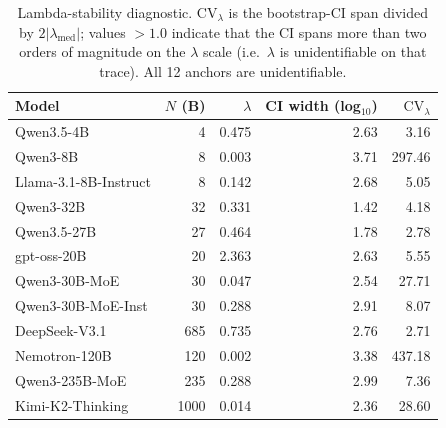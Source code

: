 \begin{table}[t]
\centering
\small
\caption{Lambda-stability diagnostic.  $\mathrm{CV}_\lambda$ is the
bootstrap-CI span divided by $2 |\lambda_\mathrm{med}|$; values
$> 1.0$ indicate that the CI spans more than two orders of magnitude
on the $\lambda$ scale (i.e.\ $\lambda$ is unidentifiable on that
trace).  All 12 anchors are unidentifiable.
\label{tab:iter109-stability}}
\begin{tabular}{lrrrr}
\toprule
Model & $N$ (B) & $\lambda$ & CI width (log$_{10}$) & $\mathrm{CV}_\lambda$ \\
\midrule
Qwen3.5-4B            &    4 &  0.475 &  2.63 &    3.16 \\
Qwen3-8B              &    8 &  0.003 &  3.71 &  297.46 \\
Llama-3.1-8B-Instruct &    8 &  0.142 &  2.68 &    5.05 \\
Qwen3-32B             &   32 &  0.331 &  1.42 &    4.18 \\
Qwen3.5-27B           &   27 &  0.464 &  1.78 &    2.78 \\
gpt-oss-20B           &   20 &  2.363 &  2.63 &    5.55 \\
Qwen3-30B-MoE         &   30 &  0.047 &  2.54 &   27.71 \\
Qwen3-30B-MoE-Inst    &   30 &  0.288 &  2.91 &    8.07 \\
DeepSeek-V3.1         &  685 &  0.735 &  2.76 &    2.71 \\
Nemotron-120B         &  120 &  0.002 &  3.38 &  437.18 \\
Qwen3-235B-MoE        &  235 &  0.288 &  2.99 &    7.36 \\
Kimi-K2-Thinking      & 1000 &  0.014 &  2.36 &   28.60 \\
\bottomrule
\end{tabular}
\end{table}